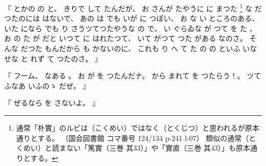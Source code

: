 %
『
とかの
の
と、
%
きりで
して
たんだが、
%
お
さんが
たやうに
に
まつた
\footnote{%
通常「朴實」のルビは（こくめい）ではなく（とくじつ）と思われるが原本通りとする。
（国会図書館 コマ番号 124/134 p-241 l-07）
類似の通常（とくめい）と読まない「篤實（三巻 其33）」や「實直（三巻 其43）」も原本通りとする。
}%
な
だ
%
つたのには
はないで、
%
あの
は
でも%
いが
に
つぽい、
%
お
な
い
ところのある、
%
いた
になら
でも
り
さうツてつたやうな
の
で、
%
い
ぐらゐな
が
つて
を
た
、
%
お
の%
た
が
だと
いつて
に
はれたつて、
%
いて
がつて
つた
がある
なのさ。
%
そんな
%
だつた
もんだから
も
かないのに、
%
これも
り
へ
て
た
の
の
といふ
いなせな
と
れず
て
つたのさ。
』

%
『
フーム、
%
なある
。
%
お
が
を
つたんだナ。
%
から
まれて
を
つたらう！。
%
ツて
ふなあ
いふのゝ
だぜ。
』

%
『
ぜるなら
を
さないよ。
』

